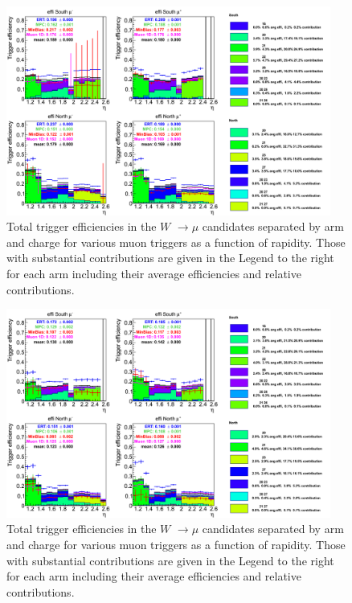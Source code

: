 \begin{figure}[h!]

  \centering

  \includegraphics[width=0.95\textwidth]{./figures/totaltrigeffi13_all_wpt0.png}
  \caption{\label{fig:totaltrigeffi_all_wpt0} Total trigger efficiencies in the $W$ $\rightarrow \mu$ candidates separated by arm and charge for various muon triggers as a function of rapidity. Those with substantial contributions are given in the Legend to the right for each arm including their average efficiencies and relative contributions.}

\end{figure}
\clearpage
\begin{figure}[h!]

  \centering

  \includegraphics[width=0.95\textwidth]{./figures/totaltrigeffi13_all_wpt1.png}
  \caption{\label{fig:totaltrigeffi_all_wpt1} Total trigger efficiencies in the $W$ $\rightarrow \mu$ candidates separated by arm and charge for various muon triggers as a function of rapidity. Those with substantial contributions are given in the Legend to the right for each arm including their average efficiencies and relative contributions.}

\end{figure}
\clearpage

